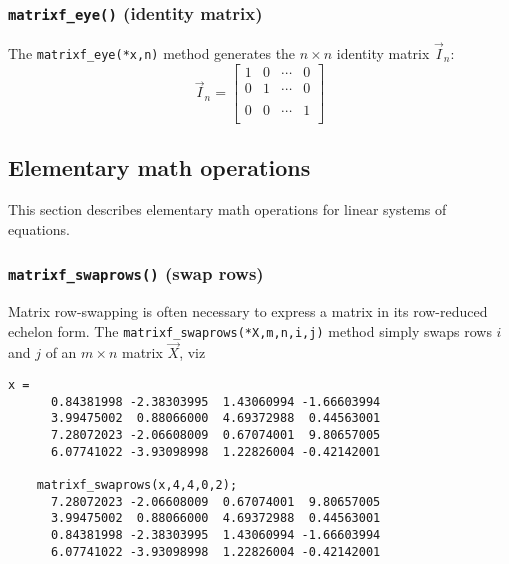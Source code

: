 \subsubsection{{\tt matrixf\_eye()} (identity matrix)}
\label{module:matrix:eye}
The {\tt matrixf\_eye(*x,n)} method generates the $n \times n$ identity
matrix $\vec{I}_n$:
%
\begin{equation}
\label{eqn:matrix:eye}
    \vec{I}_n = 
    \begin{bmatrix}
        1 & 0 & \cdots & 0 \\
        0 & 1 & \cdots & 0 \\
        \\
        0 & 0 & \cdots & 1 \\
    \end{bmatrix}
\end{equation}

% 
%
\subsection{Elementary math operations}
\label{module:matrix:elementary}
This section describes elementary math operations for linear systems of
equations.

\subsubsection{{\tt matrixf\_swaprows()} (swap rows)}
\label{module:matrix:swaprows}
Matrix row-swapping is often necessary to express a matrix in its
row-reduced echelon form.
The {\tt matrixf\_swaprows(*X,m,n,i,j)} method simply swaps rows $i$ and
$j$ of an $m \times n$ matrix $\vec{X}$, viz
%
\begin{Verbatim}[fontsize=\small]
    x = 
      0.84381998 -2.38303995  1.43060994 -1.66603994
      3.99475002  0.88066000  4.69372988  0.44563001
      7.28072023 -2.06608009  0.67074001  9.80657005
      6.07741022 -3.93098998  1.22826004 -0.42142001

    matrixf_swaprows(x,4,4,0,2);
      7.28072023 -2.06608009  0.67074001  9.80657005
      3.99475002  0.88066000  4.69372988  0.44563001
      0.84381998 -2.38303995  1.43060994 -1.66603994
      6.07741022 -3.93098998  1.22826004 -0.42142001
\end{Verbatim}

